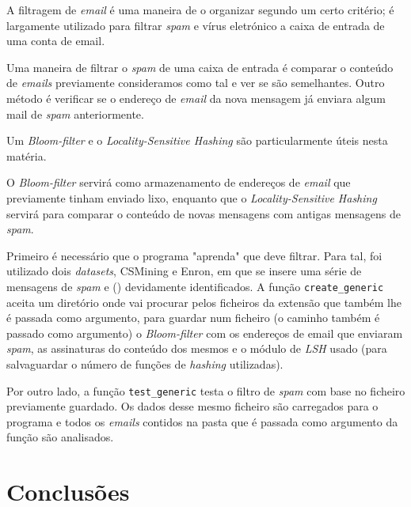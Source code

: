 \documentclass[a4paper,11pt,openright,oneside]{report}
\begin{document}
A filtragem de \textit{email}  é uma maneira de o organizar segundo um certo critério; é largamente utilizado para filtrar \textit{spam} e vírus eletrónico a caixa de entrada de uma conta de email.

Uma maneira de filtrar o \textit{spam} de uma caixa de entrada é comparar o conteúdo de \textit{emails} previamente consideramos como tal e ver se são semelhantes. Outro método é verificar se o endereço de \textit{email} da nova mensagem já enviara algum mail de \textit{spam} anteriormente.

Um \textit{Bloom-filter} e o \textit{Locality-Sensitive Hashing} são particularmente úteis nesta matéria.

O \textit{Bloom-filter} servirá como armazenamento de endereços de \textit{email} que previamente tinham enviado lixo, enquanto que o \textit{Locality-Sensitive Hashing} servirá para comparar o conteúdo de novas mensagens com antigas mensagens de \textit{spam}.

Primeiro é necessário que o programa "aprenda" que  deve filtrar. Para tal, foi utilizado dois \textit{datasets}, CSMining e Enron, em que se insere uma série de mensagens de \textit{spam} e  () devidamente identificados. A função \texttt{create\_generic} aceita um diretório onde vai procurar pelos ficheiros da extensão que também lhe é passada como argumento, para guardar num ficheiro (o caminho também é passado como argumento) o \textit{Bloom-filter} com os endereços de email que enviaram \textit{spam}, as assinaturas do conteúdo dos mesmos e o módulo de \textit{LSH} usado (para salvaguardar o número de funções de \textit{hashing} utilizadas).

Por outro lado, a função \texttt{test\_generic} testa o filtro de \textit{spam} com base no ficheiro previamente guardado. Os dados desse mesmo ficheiro são carregados para o programa e todos os \textit{emails} contidos na pasta que é passada como argumento da função são analisados.

\chapter{Conclusões}
\label{chap.conclusões}

\maketitle
\nocite{*}
\printbibliography[title={Referências}]
\end{document}
